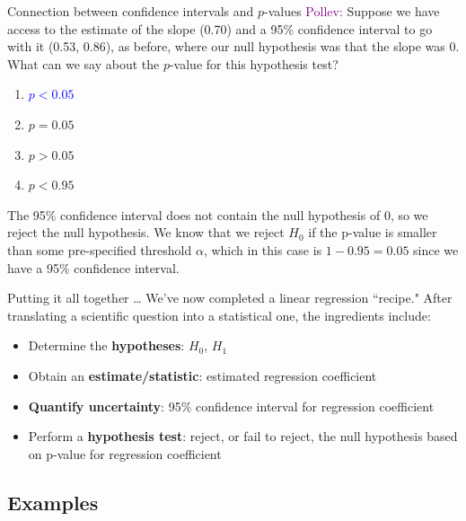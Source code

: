 \documentclass[10pt,t]{beamer}
\begin{document}
\begin{frame}{Connection between confidence intervals and $p$-values}
\textcolor{purple}{Pollev:} Suppose we have access to the estimate of the slope (0.70) and a 95\% confidence interval to go with it (0.53, 0.86), as before, where our null hypothesis was that the slope was $0$. What can we say about the $p$-value for this hypothesis test?

\vspace{0.3cm}

\begin{enumerate}
	\item \textcolor{blue}{$p < 0.05$}
	\item \sout{$p = 0.05$}
	\item \sout{$p > 0.05$}
	\item \sout{$p < 0.95$}
\end{enumerate}

\vspace{0.3cm}

The 95\% confidence interval does not contain the null hypothesis of $0$, so we reject the null hypothesis. We know that we reject $H_0$ if the p-value is smaller than some pre-specified threshold $\alpha$, which in this case is $1 - 0.95 = 0.05$ since we have a 95\% confidence interval.

\end{frame}



\begin{frame}{Putting it all together \dots}
We've now completed a linear regression ``recipe." After translating a scientific question into a statistical one, the ingredients include:

\vspace{0.3cm}

\begin{itemize}
	\item Determine the \textbf{hypotheses}: $H_0$, $H_1$
	\item Obtain an \textbf{estimate/statistic}: estimated regression coefficient
	\item \textbf{Quantify uncertainty}: 95\% confidence interval for regression coefficient
	\item Perform a \textbf{hypothesis test}: reject, or fail to reject, the null hypothesis based on p-value for regression coefficient
\end{itemize}
\end{frame}

\subsection{Examples}
\end{document}
